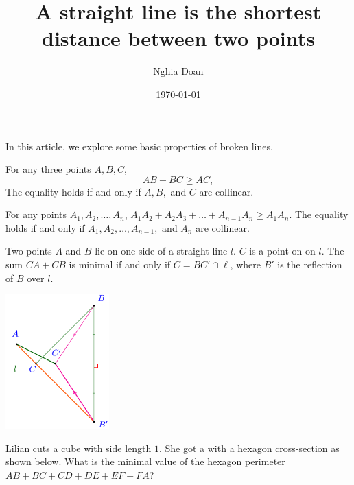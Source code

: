 \documentclass{article}
\title{A straight line is the shortest distance between two points}
\author{Nghia Doan}
\date{\today}
\begin{document}
\maketitle

In this article, we explore some basic properties of broken lines.

\begin{fact*}
    \label{fact:triangle-inequality}
    For any three points $A,B,C$, \[ AB + BC \ge AC, \]
    The equality holds if and only if $A, B,$ and $C$ are collinear.
\end{fact*}

\begin{fact*}
    \label{fact:broken-line-inequality}
    For any points $A_1,A_2,\ldots,A_n$, $A_1A_2 + A_2A_3 + \ldots + A_{n-1} A_{n} \ge A_1 A_n.$
    The equality holds if and only if $A_1,A_2,\ldots,A_{n-1},$ and $A_n$ are collinear.
\end{fact*}

\begin{lemma*}
    \label{lemma:heron-problem}
    Two points $A$ and $B$ lie on one side of a straight line $l$.
    $C$ is a point on on $l$.
    The sum $CA+CB$ is minimal if and only if $C = BC' \cap \ell$, where $B'$ is the reflection of $B$ over $l$. 
\end{lemma*}

\begin{center}
    \includegraphics[width=4cm]{./asy/pdf/heron-problem-1.pdf}
\end{center}

\newpage

\begin{example*}

    Lilian cuts a cube with side length $1.$ She got a with a hexagon cross-section as shown below.
    What is the minimal value of the hexagon perimeter $AB+BC+CD+DE+EF+FA$?
\end{example*}
\end{document}
